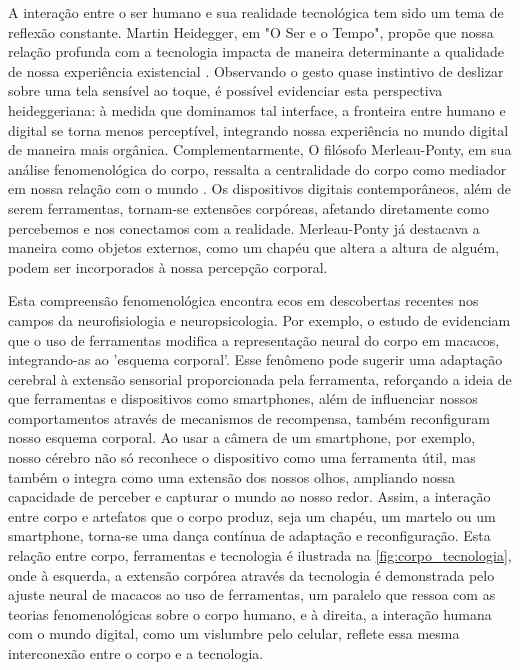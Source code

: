 A interação entre o ser humano e sua realidade tecnológica tem sido um tema de reflexão constante. Martin Heidegger, em "O Ser e o Tempo", propõe que nossa relação profunda com a tecnologia impacta de maneira determinante a qualidade de nossa experiência existencial  \cite{2012_Silva_DISSERTATION}. Observando o gesto quase instintivo de deslizar sobre uma tela sensível ao toque, é possível evidenciar esta perspectiva heideggeriana: à medida que dominamos tal interface, a fronteira entre humano e digital se torna menos perceptível, integrando nossa experiência no mundo digital de maneira mais orgânica. Complementarmente, O filósofo Merleau-Ponty, em sua análise fenomenológica do corpo, ressalta a centralidade do corpo como mediador em nossa relação com o mundo \cite{2011_MerleauPonty_BOOK}. Os dispositivos digitais contemporâneos, além de serem ferramentas, tornam-se extensões corpóreas, afetando diretamente como percebemos e nos conectamos com a realidade. Merleau-Ponty já destacava a maneira como objetos externos, como um chapéu que altera a altura de alguém, podem ser incorporados à nossa percepção corporal.

Esta compreensão fenomenológica encontra ecos em descobertas recentes nos campos da neurofisiologia e neuropsicologia. Por exemplo, o estudo de  evidenciam que o uso de ferramentas modifica a representação neural do corpo em macacos, integrando-as ao 'esquema corporal'. Esse fenômeno pode sugerir uma adaptação cerebral à extensão sensorial proporcionada pela ferramenta, reforçando a ideia de que ferramentas e dispositivos como smartphones, além de influenciar nossos comportamentos através de mecanismos de recompensa, também reconfiguram nosso esquema corporal. Ao usar a câmera de um smartphone, por exemplo, nosso cérebro não só reconhece o dispositivo como uma ferramenta útil, mas também o integra como uma extensão dos nossos olhos, ampliando nossa capacidade de perceber e capturar o mundo ao nosso redor. Assim, a interação entre corpo e artefatos que o corpo produz, seja um chapéu, um martelo ou um smartphone, torna-se uma dança contínua de adaptação e reconfiguração. Esta relação entre corpo, ferramentas e tecnologia é ilustrada na \autoref{fig:corpo_tecnologia}, onde à esquerda, a extensão corpórea através da tecnologia é demonstrada pelo ajuste neural de macacos ao uso de ferramentas, um paralelo que ressoa com as teorias fenomenológicas sobre o corpo humano, e à direita, a interação humana com o mundo digital, como um vislumbre pelo celular, reflete essa mesma interconexão entre o corpo e a tecnologia.

